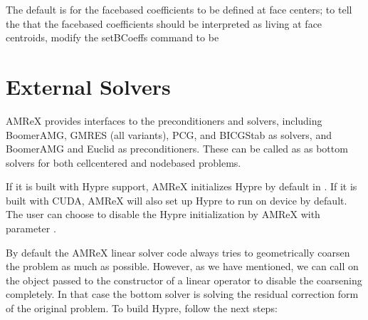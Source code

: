 \documentclass[letterpaper,10pt,english]{sphinxmanual}
\begin{document}
\sphinxAtStartPar
The default is for the face\sphinxhyphen{}based coefficients to be defined at face centers;
to tell the that the face\sphinxhyphen{}based coefficients should be interpreted
as living at face centroids, modify the setBCoeffs command to be

\begin{sphinxVerbatim}[commandchars=\\\{\}]
  
\end{sphinxVerbatim}


\section{External Solvers}
\label{\detokenize{LinearSolvers:external-solvers}}
\sphinxAtStartPar
AMReX provides interfaces to the  preconditioners and solvers, including BoomerAMG, GMRES (all variants), PCG, and BICGStab as
solvers, and BoomerAMG and Euclid as preconditioners.  These can be called as
as bottom solvers for both cell\sphinxhyphen{}centered and node\sphinxhyphen{}based problems.

\sphinxAtStartPar
If it is built with Hypre support, AMReX initializes Hypre by default in
.  If it is built with CUDA, AMReX will also set up Hypre
to run on device by default.  The user can choose to disable the Hypre
initialization by AMReX with  parameter
.

\sphinxAtStartPar
By default the AMReX linear solver code always tries to geometrically coarsen the
problem as much as possible.  However, as we have mentioned, we can
call  on the  object
passed to the constructor of a linear operator to disable the
coarsening completely.  In that case the bottom solver is solving the
residual correction form of the original problem. To build Hypre, follow the next steps:
\end{document}
